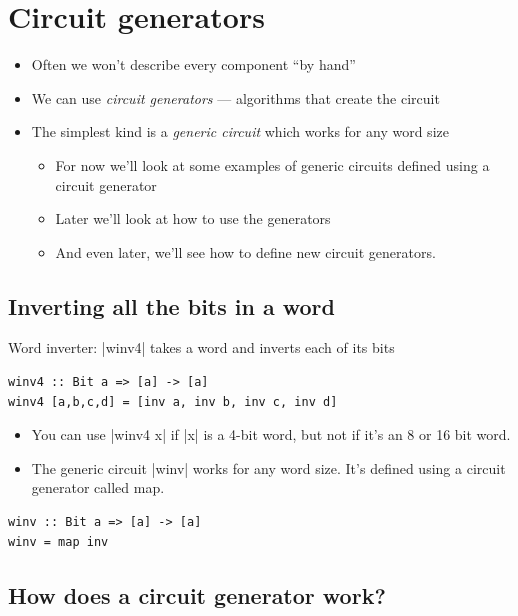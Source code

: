 \documentclass[]{svmono}
\begin{document}
\section*{Circuit generators}
\label{sec:org48c14e0}

\begin{itemize}
\item Often we won't describe every component ``by hand''

\item We can use \emph{circuit generators} --- algorithms that
create the circuit

\item The simplest kind is a \emph{generic circuit} which works for
any word size

\begin{itemize}
\item For now we'll look at some examples of generic circuits
defined using a circuit generator

\item Later we'll look at how to use the generators

\item And even later, we'll see how to define new circuit
generators.
\end{itemize}
\end{itemize}
\subsection*{Inverting all the bits in a word}
\label{sec:org2f975c2}

Word inverter: |winv4| takes a word and inverts each of its bits

\begin{verbatim}
winv4 :: Bit a => [a] -> [a]
winv4 [a,b,c,d] = [inv a, inv b, inv c, inv d]
\end{verbatim}

\begin{itemize}
\item You can use |winv4 x| if |x| is a 4-bit word, but
not if it's an 8 or 16 bit word.
\item The generic circuit |winv| works for any word
size.  It's defined using a circuit generator called
map.
\end{itemize}

\begin{verbatim}
winv :: Bit a => [a] -> [a]
winv = map inv
\end{verbatim}
\subsection*{How does a circuit generator work?}
\label{sec:orgc58ee8f}
\end{document}
